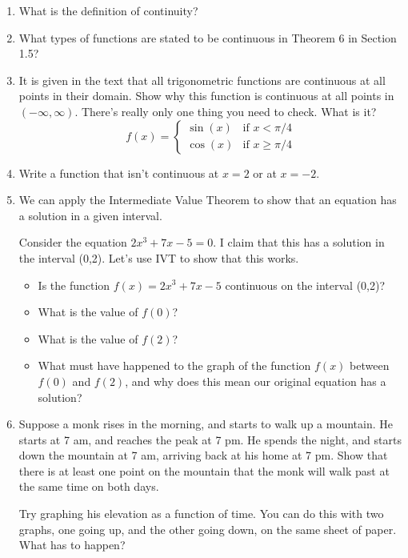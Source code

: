 \documentclass[11pt]{article}
\begin{document}
\begin{enumerate}
\item What is the definition of continuity? 
\item What types of functions are stated to be continuous in Theorem 6 in Section 1.5?
\item It is given in the text that all trigonometric functions are continuous at all points in their domain. Show why this function is continuous at all points in $(-\infty, \infty)$. There's really only one thing you need to check. What is it?
$$f(x) = \left\{ \begin{array}{rl} \sin(x) & \mbox{if } x < \pi/4\\ \cos(x) & \mbox{if } x \geq \pi/4 \end{array}\right.$$
\item Write a function that isn't continuous at $x = 2$ or at $x = -2$.
\item We can apply the Intermediate Value Theorem to show that an equation has a solution in a given interval.

Consider the equation $2x^3 + 7x - 5 = 0$. I claim that this has a solution in the interval (0,2). Let's use IVT to show that this works.

\begin{itemize}
\item Is the function $f(x) = 2x^3 + 7x -5$ continuous on the interval (0,2)?
\item What is the value of $f(0)$?
\item What is the value of $f(2)$?
\item What must have happened to the graph of the function $f(x)$ between $f(0)$ and $f(2)$, and why does this mean our original equation has a solution?
\end{itemize}
\item Suppose a monk rises in the morning, and starts to walk up a mountain. He starts at 7 am, and reaches the peak at 7 pm. He spends the night, and starts down the mountain at 7 am, arriving back at his home at 7 pm. Show that there is at least one point on the mountain that the monk will walk past at the same time on both days.

Try graphing his elevation as a function of time. You can do this with two graphs, one going up, and the other going down, on the same sheet of paper. What has to happen?
\end{enumerate}
\end{document}
